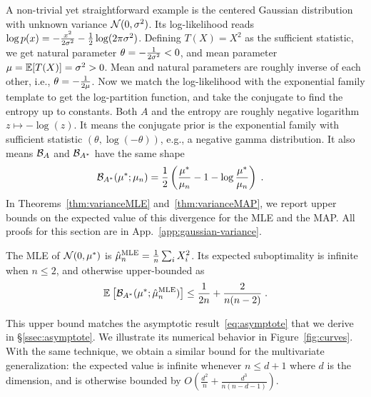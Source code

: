 \documentclass[twoside]{article}
\newcommand*{\expect}[2][]{\ensuremath{\mathbb{E}_{#1} \left[ #2 \right] }} %
\newcommand{\logpart}{A}
\newcommand{\conj}{\logpart^*}
\newcommand{\bregman}{\cB_\logpart}
\newcommand{\bregmanconj}{\cB_{\logpart^*}}
\newcommand{\nat}{\theta}
\newcommand{\m}{\mu}
\begin{document}
A non-trivial yet straightforward example is the centered Gaussian distribution with unknown variance ${\mathcal N}(0,\sigma^2)$.
Its log-likelihood reads $\log p(x) = -\frac{x^2}{2 \sigma^2} - \frac{1}{2}\log(2\pi \sigma^2)$.
Defining $T(X)=X^2$ as the sufficient statistic, we get natural parameter $\nat = -\inv{2 \sigma^2} <0$, and mean parameter $\m=\E[T(X)] = \sigma^2 >0$.
Mean and natural parameters are roughly inverse of each other, i.e., $\nat = -\inv{2 \m}$.
Now we match the log-likelihood with the exponential family template to get the log-partition function, and take the conjugate to find the entropy
\aligns{
	\logpart (\nat) = - \half \log(-\nat) \quad\text{and}\quad
	\conj(\m) = - \half \log(\m)  \; ,
}
up to constants.
Both $A$ and  the entropy are roughly negative logarithm $z\mapsto - \log(z)$.
It means the conjugate prior is the exponential family with sufficient statistic $(\nat, \log(-\nat) )$, e.g., a negative gamma distribution.
It also means $\bregman$ and $\bregmanconj$ have the same shape
\begin{align}
	\bregmanconj( \m^*; \m_n)
	&= \half \left ( \frac{\m^*}{ \m_n} - 1 - \log  \frac{\m^*}{ \m_n} \right) \; .
\end{align}
In Theorems~\ref{thm:varianceMLE} and~\ref{thm:varianceMAP}, we report upper bounds on the expected value of this divergence for the MLE and the MAP.
All proofs for this section are in App.~\ref{app:gaussian-variance}.
\begin{theorem}
\label{thm:varianceMLE}
	The MLE of $\cN(0,\m^*)$ is $\hat \m_n^\text{MLE} = \inv{n} \sum_i X_i^2 $.
	Its expected suboptimality is infinite when $n\leq 2$, and otherwise upper-bounded as
	\begin{align}
		 \expect{\bregmanconj( \m^*; \hat \m_n^\text{MLE}) }
			\leq \inv{2n} +\frac{2}{n(n-2)} \; .
			\label{eq:MLE_rate}
	\end{align}
\end{theorem}
This upper bound matches the asymptotic result~\eqref{eq:asymptote} that we derive in \S\ref{ssec:asymptote}.
We illustrate its numerical behavior in Figure~\ref{fig:curves}.
With the same technique, we obtain a similar bound for the multivariate generalization: the expected value is infinite whenever $n \leq d+1$ where $d$ is the dimension, and is otherwise bounded by $O(\frac{d^2}{n} + \frac{d^3}{n(n-d-1)} )$.
\end{document}

